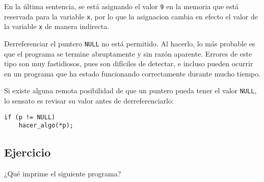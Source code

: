 En la última sentencia, se está asignando el valor \lstinline!9! en la
memoria que está reservada para la variable \lstinline!x!, por lo que la
asignacion cambia en efecto el valor de la variable \lstinline!x! de
manera indirecta.

Derreferenciar el puntero \lstinline!NULL! no está permitido. Al
hacerlo, lo más probable es que el programa se termine abruptamente y
sin razón aparente. Errores de este tipo son muy fastidiosos, pues son
difíciles de detectar, e incluso pueden ocurrir en un programa que ha
estado funcionando correctamente durante mucho tiempo.

Si existe alguna remota posibilidad de que un puntero pueda tener el
valor \lstinline!NULL!, lo sensato es revisar su valor antes de
derreferenciarlo:

\begin{lstlisting}
if (p != NULL)
    hacer_algo(*p);
\end{lstlisting}

\subsection{Ejercicio}

¿Qué imprime el siguiente programa?
